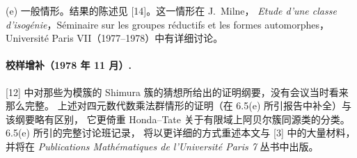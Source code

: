 (e) 一般情形。结果的陈述见 [14]。这一情形在 J.~Milne，
\emph{Etude d'une classe d'isog\'enie}，S\'eminaire sur les groupes r\'eductifs et les
formes automorphes，Universit\'e Paris VII（1977--1978）中有详细讨论。

\paragraph*{校样增补（1978 年 11 月）.}
[12] 中对那些为模簇的 Shimura 簇的猜想所给出的证明纲要，没有会议当时看来那么完整。
上述对四元数代数乘法群情形的证明（在 6.5(e) 所引报告中补全）与该纲要略有区别，
它更倚重 Honda--Tate 关于有限域上阿贝尔簇同源类的分类。6.5(e) 所引的完整讨论班记录，
将以更详细的方式重述本文与 [3] 中的大量材料，并将在
\emph{Publications Math\'ematiques de l'Universit\'e Paris 7} 丛书中出版。

